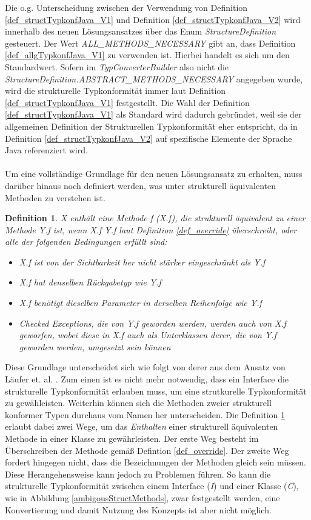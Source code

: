 \documentclass[11pt, 
ngerman,
doublespacing,
chapterinoneline, %
consistentlayout, %
]{scrartcl}
\newtheorem{definition}{Definition}
\begin{document}
Die o.g. Unterscheidung zwischen der Verwendung von Definition \ref{def_structTypkonfJava_V1} und Definition \ref{def_structTypkonfJava_V2} wird innerhalb des neuen Lösungsansatzes über das Enum \emph{StructureDefinition} gesteuert. Der Wert \emph{ALL\_METHODS\_NECESSARY} gibt an, dass Definition \ref{def_allgTypkonfJava_V1} zu verwenden ist. Hierbei handelt es sich um den Standardwert. Sofern im \emph{TypConverterBuilder} also nicht die \emph{StructureDefinition.ABSTRACT\_METHODS\_NECESSARY} angegeben wurde, wird die strukturelle Typkonformität immer laut Definition \ref{def_structTypkonfJava_V1} festgestellt. Die Wahl der Definition \ref{def_structTypkonfJava_V1} als Standard wird dadurch gebründet, weil sie der allgemeinen Definition der Strukturellen Typkonformität eher entspricht, da in Definition \ref{def_structTypkonfJava_V2} auf spezifische Elemente der Sprache Java referenziert wird.\\\\
Um eine vollständige Grundlage für den neuen Lösungsansatz zu erhalten, muss darüber hinaus noch definiert werden, was unter strukturell äquivalenten Methoden zu verstehen ist.
\begin{definition}\label{def_containMethod_V1}
\emph{X} enthält eine Methode \emph{f} (\emph{X.f)}, die strukturell äquivalent zu einer Metho\-de \emph{Y.f} ist, wenn \emph{X.f} \emph{Y.f} laut Definition \ref{def_override} überschreibt, oder alle der folgenden Bedingungen erfüllt sind:
\begin{itemize}
\item \emph{X.f} ist von der Sichtbarkeit her nicht stärker eingeschränkt als \emph{Y.f}
\item \emph{X.f} hat denselben Rückgabetyp wie \emph{Y.f}
\item \emph{X.f} benötigt dieselben Parameter in derselben Reihenfolge wie \emph{Y.f}
\item Checked Exceptions, die von \emph{Y.f} geworden werden, werden auch von \emph{X.f} geworfen, wobei diese in \emph{X.f} auch als Unterklassen derer, die von \emph{Y.f} geworden werden, umgesetzt sein können
\end{itemize} 
\end{definition}
Diese Grundlage unterscheidet sich wie folgt von derer aus dem Ansatz von Läufer et. al. \cite{structconfjava}. Zum einen ist es nicht mehr notwendig, dass ein Interface die strukturelle Typkonformität erlauben muss, um eine strutkurelle Typkonformität zu gewähleisten. Weiterhin können sich die Methoden zweier strukturell konformer Typen durchaus vom Namen her unterscheiden. Die Definition \ref{def_containMethod_V1} erlaubt dabei zwei Wege, um das \emph{Enthalten} einer strukturell äquivalenten Methode in einer Klasse zu gewährleisten. Der erste Weg besteht im Überschreiben der Methode gemäß Defintion \ref{def_override}. Der zweite Weg fordert hingegen nicht, dass die Bezeichnungen der Methoden gleich sein müssen. Diese Heran\-gehensweise kann jedoch zu Problemen führen. So kann die strukturelle Typkonformität zwischen einem Interface (\emph{I}) und einer Klasse (\emph{C}), wie in Abbildung \ref{ambigousStructMethods}, zwar festgestellt werden, eine Konvertierung und damit Nutzung des Konzepts ist aber nicht möglich. 
\end{document}
